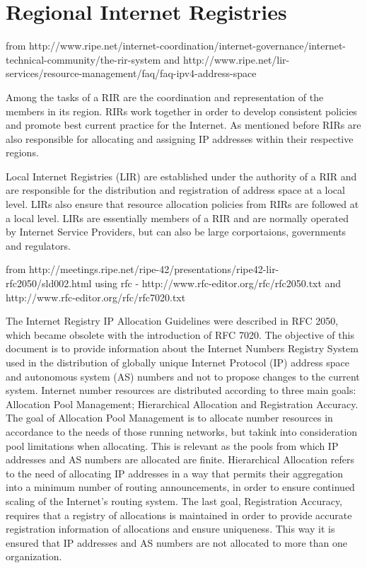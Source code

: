 \documentclass[11pt,a4paper]{scrreprt}
\begin{document}
\section{Regional Internet Registries}
from http://www.ripe.net/internet-coordination/internet-governance/internet-technical-community/the-rir-system and http://www.ripe.net/lir-services/resource-management/faq/faq-ipv4-address-space


Among the tasks of a RIR are the coordination and representation of the members in its region. RIRs work together in order to develop consistent policies and promote best current practice for the Internet. As mentioned before RIRs are also responsible for allocating and assigning IP addresses within their respective regions. 

Local Internet Registries (LIR) are  established under the authority of a RIR and are responsible for the distribution and registration of address space at a local level. LIRs also ensure that resource allocation policies from RIRs are followed at a local level. LIRs are essentially members of a RIR and are normally operated by Internet Service Providers, but can also be large corportaions, governments and regulators.

from http://meetings.ripe.net/ripe-42/presentations/ripe42-lir-rfc2050/sld002.html using rfc - http://www.rfc-editor.org/rfc/rfc2050.txt and http://www.rfc-editor.org/rfc/rfc7020.txt

The Internet Registry IP Allocation Guidelines were described in RFC 2050, which became obsolete with the introduction of RFC 7020. The objective of this document is to provide information about the Internet Numbers Registry System used in the distribution of globally unique Internet Protocol (IP) address space and autonomous system (AS) numbers and not to propose changes to the current system. Internet number resources are distributed according to three main goals: Allocation Pool Management; Hierarchical Allocation and Registration Accuracy. The goal of Allocation Pool Management is to allocate number resources in accordance to the needs of those running networks, but takink into consideration pool limitations when allocating. This is relevant as the pools from which IP addresses and AS numbers are allocated are finite. Hierarchical Allocation refers to the need of allocating IP addresses in a way that permits their aggregation into a minimum number of routing announcements, in order to ensure continued scaling of the Internet's routing system. The last goal, Registration Accuracy,  requires that a registry of allocations is maintained in order to provide accurate registration information of allocations and ensure uniqueness. This way it is ensured that IP addresses and AS numbers are not allocated to more than one organization.  
\end{document}

